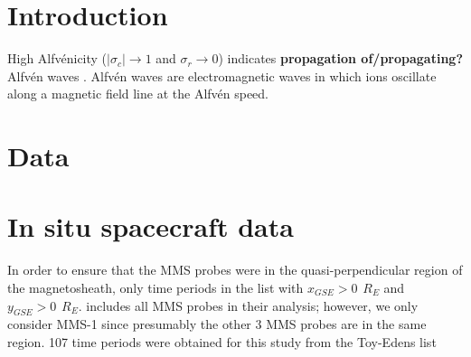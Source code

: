 
\section{Introduction}
High Alfv\'enicity ($|\sigma_c| \rightarrow 1$ and $\sigma_r \rightarrow 0$) indicates \textbf{propagation of/propagating?} Alfv\'en waves \cite{Bavassano:1998}. Alfv\'en waves are electromagnetic waves in which ions oscillate along a magnetic field line at the Alfv\'en speed. 




\section{Data}
\section{In situ spacecraft data}
In order to ensure that the MMS probes were in the quasi-perpendicular region of the magnetosheath, only time periods in the list with $x_{GSE}>0\hspace{5pt}R_E$ and $y_{GSE}>0\hspace{5pt}R_E$.  includes all MMS probes in their analysis; however, we only consider MMS-1 since presumably the other 3 MMS probes are in the same region. 107 time periods were obtained for this study from the Toy-Edens list 


